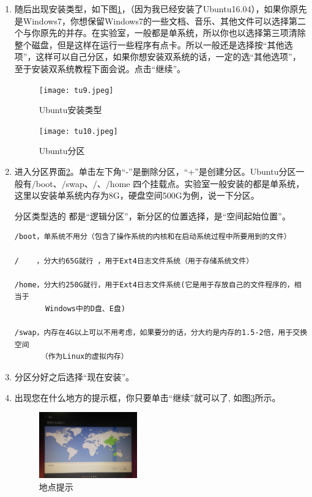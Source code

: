 \documentclass{article}
\begin{document}
\begin{enumerate}
\item  随后出现安装类型，如下图\ref{tu9}，（因为我已经安装了Ubuntu16.04），如果你原先是Windows7，你想保留Windows7的一些文档、音乐、其他文件可以选择第二个与你原先的并存。在实验室，一般都是单系统，所以你也以选择第三项清除整个磁盘，但是这样在运行一些程序有点卡。所以一般还是选择按“其他选项”，这样可以自己分区，如果你想安装双系统的话，一定的选{\color{red}“其他选项”}，至于安装双系统教程下面会说。点击“继续”。

\begin{figure}[!htb] %
\centering
\texttt{[image: tu9.jpeg]}
\caption{\small Ubuntu安装类型}
\label{tu9}
\end{figure} 
\begin{figure}[!htb] %
\centering
\texttt{[image: tu10.jpeg]}
\caption{\small Ubuntu分区}
\label{tu10}
\end{figure} 

\item  进入分区界面\ref{tu10}。单击左下角“-”是删除分区，“+”是创建分区。Ubuntu分区一般有$\slash$boot、$\slash$swap、$\slash$、$\slash$home 四个挂载点。实验室一般安装的都是单系统，这里以安装单系统内存为8G，硬盘空间500G为例，说一下分区。

分区类型选的 都是“逻辑分区”，新分区的位置选择，是“空间起始位置”。

\begin{verbatim}
/boot，单系统不用分（包含了操作系统的内核和在启动系统过程中所要用到的文件）

/    ，分大约65G就行 ，用于Ext4日志文件系统（用于存储系统文件）

/home，分大约250G就行，用于Ext4日志文件系统(它是用于存放自己的文件程序的，相当于
       Windows中的D盘、E盘)

/swap，内存在4G以上可以不用考虑，如果要分的话，分大约是内存的1.5-2倍，用于交换空间
      （作为Linux的虚拟内存）

\end{verbatim}

\item   分区分好之后选择“现在安装”。

\item 出现您在什么地方的提示框，你只要单击“继续”就可以了, 如图\ref{tu12}所示。

\begin{figure}[!htb] %
\centering
\includegraphics[width=0.4\textwidth]{tu12.jpeg}
\caption{\small 地点提示}
\label{tu12}
\end{figure} 


\end{enumerate}
\end{document}
